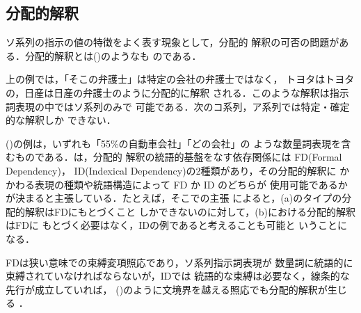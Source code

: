 \subsection{分配的解釈}
ソ系列の指示の値の特徴をよく表す現象として，分配的
解釈の可否の問題がある．分配的解釈とは()のようなも
のである．


上の例では，「そこの弁護士」は特定の会社の弁護士ではなく，
トヨタはトヨタの，日産は日産の弁護士のように分配的に解釈
される．このような解釈は指示詞表現の中ではソ系列のみで
可能である．次のコ系列，ア系列では特定・確定的な解釈しか
できない．


()の例は，いずれも「55\%の自動車会社」「どの会社」の
ような数量詞表現を含むものである．は，分配的
解釈の統語的基盤をなす依存関係には FD(Formal Dependency)，
ID(Indexical Dependency)の2種類があり，その分配的解釈に
かかわる表現の種類や統語構造によって FD か ID のどちらが
使用可能であるかが決まると主張している．たとえば，そこでの主張
によると，(a)のタイプの分配的解釈はFDにもとづくこと
しかできないのに対して，(b)における分配的解釈はFDに
もとづく必要はなく，IDの例であると考えることも可能と
いうことになる．

FDは狭い意味での束縛変項照応であり，ソ系列指示詞表現が
数量詞に統語的に束縛されていなければならないが，IDでは
統語的な束縛は必要なく，線条的な先行が成立していれば，
()のように文境界を越える照応でも分配的解釈が生じる ．

